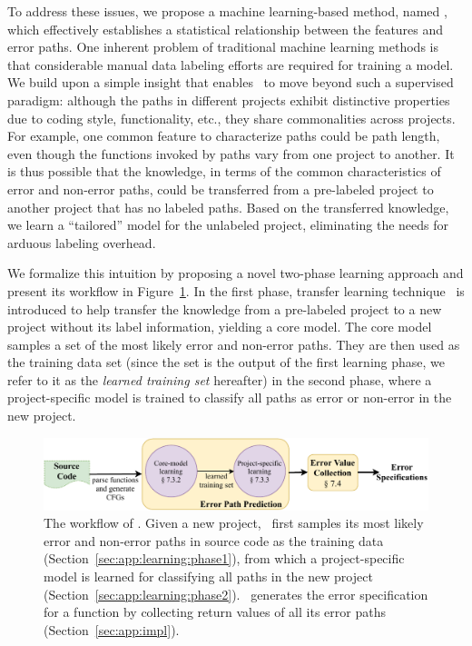 \documentclass[12pt]{report}	%
\begin{document}
To address these issues, we propose a machine learning-based method, named \newTool,
which effectively establishes a statistical relationship between the features and error paths. 
One inherent problem of traditional machine learning methods is that 
considerable manual data labeling efforts are required for training a model.
We build upon a simple insight that enables \newTool\ to move 
beyond such a supervised paradigm:
although the paths in different projects exhibit distinctive properties 
due to coding style, functionality, etc.,
they share commonalities across projects. 
For example,
one common feature to characterize paths could be path length,
even though the functions invoked by paths vary from one project to another.
%
It is thus possible that the knowledge,
in terms of the common characteristics of error and non-error paths,
could be transferred from a pre-labeled project
to another project that has no labeled paths.
%
Based on the transferred knowledge, we learn
a ``tailored'' model for the unlabeled project,
eliminating the needs for arduous labeling overhead.

We formalize this intuition by proposing a novel two-phase learning approach 
and present its workflow in Figure~\ref{fig:workflow}.
%
In the first phase, 
transfer learning technique~\cite{pan2010survey} is introduced
to help transfer the knowledge from a pre-labeled project
to a new project without its label information, 
yielding a core model.
The core model 
samples a set of the most likely error and non-error paths.
%
They are then used
as the training data set (since the set
is the output of the first learning phase,
we refer to it as the \emph{learned training set} 
hereafter) in the second phase,
where a project-specific model is trained
to classify all paths as error or non-error in the new project.

\begin{figure}[t]
\centering
\includegraphics[width=0.95\linewidth]{images/errspec_arch.pdf}
\caption[The workflow of \newTool]{The workflow of \newTool.
Given a new project, 
\newTool\ first samples its most likely error and non-error paths in source code as the training data (Section~\ref{sec:app:learning:phase1}), 
from which a project-specific model is learned for classifying all paths in the new project (Section~\ref{sec:app:learning:phase2}). 
\newTool\ generates the error specification for a function by collecting return values of all its error paths (Section~\ref{sec:app:impl}). 
}
\label{fig:workflow}
\end{figure}
\end{document}
